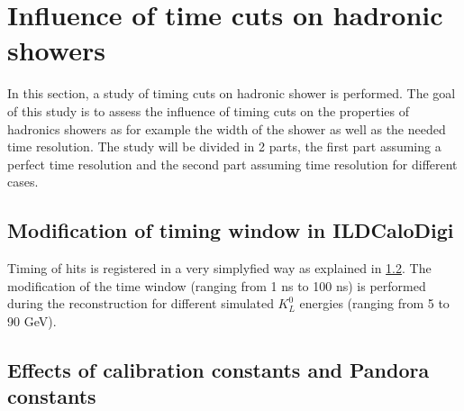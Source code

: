 \section{Influence of time cuts on hadronic showers}

In this section, a study of timing cuts on hadronic shower is performed. The goal of this study is to assess the influence of timing cuts on the properties of hadronics showers as for example the width of the shower as well as the needed time resolution. The study will be divided in 2 parts, the first part assuming a perfect time resolution and the second part assuming time resolution for different cases.

\subsection{Modification of timing window in ILDCaloDigi}

Timing of hits is registered in a very simplyfied way as explained in \ref{}. The modification of the time window (ranging from 1 ns to 100 ns) is performed during the reconstruction for different simulated $K^{0}_{L}$ energies (ranging from 5 to 90 GeV).

\subsection{Effects of calibration constants and Pandora constants}

